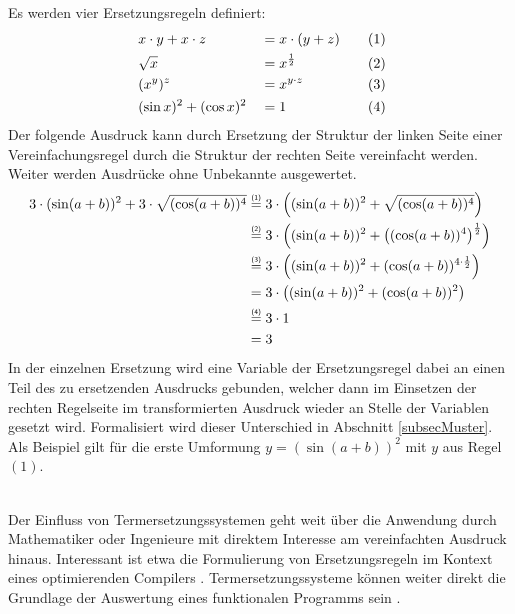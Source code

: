 \begin{beispiel}
Es werden vier Ersetzungsregeln definiert:
\begin{alignat*}{4}
    ~& x \cdot y + x \cdot z   & &= x \cdot (y + z) &~~~& (1) \\
    ~& \sqrt{x}                & &= x^{\frac 1 2}   &~~~& (2) \\
    ~& (x^y)^z           & &= x^{y \cdot z}   &~~~& (3) \\
    ~& (\sin x)^2 + (\cos x)^2 & &= 1               &~~~& (4)
\end{alignat*}
Der folgende Ausdruck kann durch Ersetzung der Struktur der linken Seite einer Vereinfachungsregel durch die Struktur der rechten Seite vereinfacht werden. Weiter werden Ausdrücke ohne Unbekannte ausgewertet.
\begin{equation*}
    \begin{split}
	3 \cdot (\sin(a + b))^2 + 3 \cdot \sqrt{(\cos(a + b))^4}
	&\stapel = {(1)} 3 \cdot \paren*{(\sin(a + b))^2 + \sqrt{(\cos(a + b))^4}} \\
	&\stapel = {(2)} 3 \cdot \paren*{(\sin(a + b))^2 + \paren*{{(\cos(a + b))^4}}^{\frac 1 2}}\\
	&\stapel = {(3)} 3 \cdot \paren*{(\sin(a + b))^2 + {(\cos(a + b))^{4 \cdot \frac 1 2}}}\\
	& =              3 \cdot \paren*{(\sin(a + b))^2 + {(\cos(a + b))^2}}\\
	&\stapel = {(4)} 3 \cdot 1\\
    & = 3
    \end{split}
\end{equation*}
In der einzelnen Ersetzung wird eine Variable der Ersetzungsregel dabei an einen Teil des zu ersetzenden Ausdrucks gebunden, welcher dann im Einsetzen der rechten Regelseite im transformierten Ausdruck wieder an Stelle der Variablen gesetzt wird.
 Formalisiert wird dieser Unterschied in Abschnitt \ref{subsecMuster}. Als Beispiel gilt für die erste Umformung $y = (\sin(a + b))^2$ mit $y$ aus Regel $(1)$.
\end{beispiel}

~\\
Der Einfluss von Termersetzungssystemen geht weit über die Anwendung durch Mathematiker oder Ingenieure mit direktem Interesse am vereinfachten Ausdruck hinaus. Interessant ist etwa die Formulierung von Ersetzungsregeln im Kontext eines optimierenden Compilers \cite{HaskellCustomRewriteRules, HaskellCoreOptimizer}. Termersetzungssysteme können weiter direkt die Grundlage der Auswertung eines funktionalen Programms sein \cite{Jones1987JanRewritingMiranda}.


